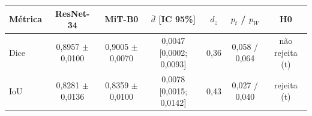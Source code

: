 \begin{tabular}{lcccccc}
\hline
Métrica & ResNet-34 & MiT-B0 & $\bar{d}$ [IC 95\%] & $d_z$ & $p_t$ / $p_W$ & H0 \\
\hline
Dice & 0,8957 $\pm$ 0,0100 & 0,9005 $\pm$ 0,0070 & 0,0047 [0,0002; 0,0093] & 0,36 & 0,058 / 0,064 & não rejeita (t) \\
IoU & 0,8281 $\pm$ 0,0136 & 0,8359 $\pm$ 0,0100 & 0,0078 [0,0015; 0,0142] & 0,43 & 0,027 / 0,040 & rejeita (t) \\
\hline
\end{tabular}
